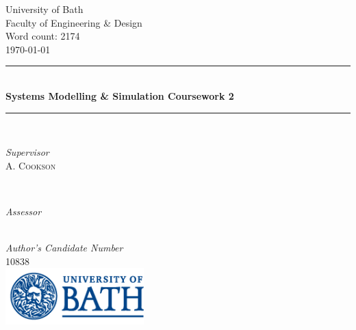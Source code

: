 \documentclass[11pt]{article}
\begin{document}
 

	\begin{titlepage}
	\thispagestyle{empty}
		\newcommand{\HRule}{\rule{\linewidth}{0.5mm}}	
		\center
		\LARGE 
		University of Bath\\
	 	Faculty of Engineering \& Design\\[1cm]	
		\large
		Word count: 2174\\[0.5cm]
		{\large\today}\\[1cm]	
		\HRule\\[0.4cm]	
		{\LARGE \bfseries Systems Modelling \& Simulation Coursework 2}\\[0.3cm] 	
		\HRule\\[1cm]	
		\begin{minipage}{0.4\textwidth}
			\begin{flushleft}
				\large
				\textit{Supervisor}\\
				A. \textsc{Cookson}
			\end{flushleft}
		\end{minipage}
		~
		\begin{minipage}{0.4\textwidth}
			\begin{flushright}
				\large
				\textit{Assessor}\\
				
			\end{flushright}
		\end{minipage}\\[1.4cm]
		\large
		\textit{Author's Candidate Number}\\
		10838\\
		\vfill
		\includegraphics[width=0.4\textwidth]{UOB_Logo.png}\\
		\vfill 
	\end{titlepage}




\thispagestyle{empty}




\tableofcontents
\thispagestyle{empty}
\listoffigures


\end{document}
